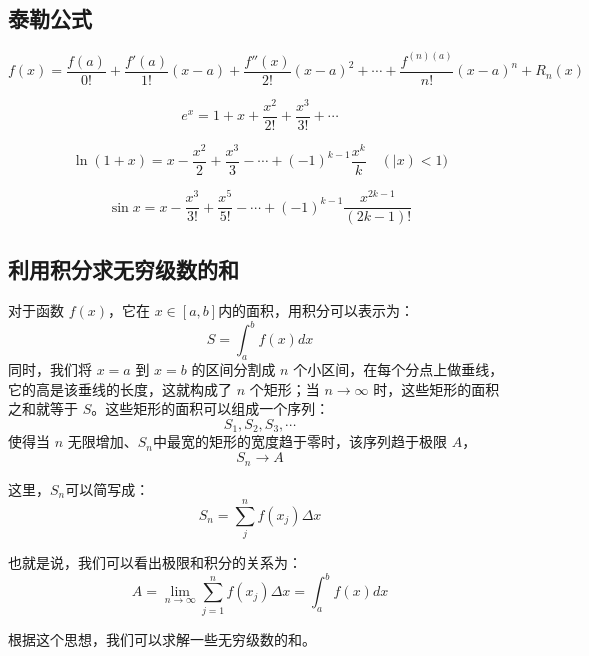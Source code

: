 \documentclass[12pt]{article}
\begin{document}
\subsection{泰勒公式}
$$
f(x) = \frac{f(a)}{0!} + \frac{f'(a)}{1!}(x-a) + \frac{f''(x)}{2!}(x-a)^2 + \cdots + \frac{f^{(n)(a)}}{n!}(x-a)^n + R_n(x)
$$

$$
e^x = 1 + x + \frac{x^2}{2!} + \frac{x^3}{3!} + \cdots
$$

$$
\ln(1+x) = x - \frac{x^2}{2} + \frac{x^3}{3} - \cdots + (-1)^{k-1}\frac{x^k}{k} \quad (|x) < 1)
$$

$$
\sin{x} = x - \frac{x^3}{3!} + \frac{x^5}{5!} - \cdots + (-1)^{k-1}\frac{x^{2k-1}}{(2k-1)!}
$$

\subsection{利用积分求无穷级数的和}
对于函数 $f(x)$，它在 $x\in[a,b]$内的面积，用积分可以表示为：
$$
S = \int_a^bf(x)dx
$$
同时，我们将 $x=a$ 到 $x=b$ 的区间分割成 $n$ 个小区间，在每个分点上做垂线，它的高是该垂线的长度，这就构成了 $n$ 个矩形；当 $n \rightarrow \infty $ 时，这些矩形的面积之和就等于 $S$。这些矩形的面积可以组成一个序列：
$$
S_1, S_2, S_3, \cdots
$$
使得当 $n$ 无限增加、$S_n$中最宽的矩形的宽度趋于零时，该序列趋于极限 $A$，
$$
S_n \rightarrow A
$$

这里，$S_n$可以简写成：
$$
S_n = \sum_j^nf(x_j)\Delta x
$$

也就是说，我们可以看出极限和积分的关系为：
$$
A = \lim_{n \rightarrow \infty}\sum_{j=1}^{n}f(x_j)\Delta x = \int_a^bf(x)dx
$$

根据这个思想，我们可以求解一些无穷级数的和。
\end{document}
